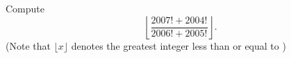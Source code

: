 Compute \[\left\lfloor \dfrac{2007!+2004!}{2006!+2005!}\right\rfloor.\] (Note that $\lfloor x \rfloor$ denotes the greatest integer less than or equal to )